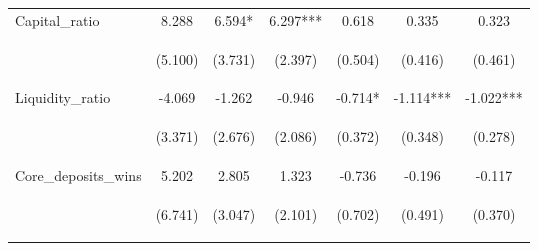\documentclass[]{article}
\begin{document}
\begin{center}
\begin{tabular}{lcccccc}
Capital\_ratio & 8.288 & 6.594* & 6.297*** & 0.618 & 0.335 & 0.323 \\
\vspace{4pt} & \begin{footnotesize}(5.100)\end{footnotesize} & \begin{footnotesize}(3.731)\end{footnotesize} & \begin{footnotesize}(2.397)\end{footnotesize} & \begin{footnotesize}(0.504)\end{footnotesize} & \begin{footnotesize}(0.416)\end{footnotesize} & \begin{footnotesize}(0.461)\end{footnotesize} \\
Liquidity\_ratio & -4.069 & -1.262 & -0.946 & -0.714* & -1.114*** & -1.022*** \\
\vspace{4pt} & \begin{footnotesize}(3.371)\end{footnotesize} & \begin{footnotesize}(2.676)\end{footnotesize} & \begin{footnotesize}(2.086)\end{footnotesize} & \begin{footnotesize}(0.372)\end{footnotesize} & \begin{footnotesize}(0.348)\end{footnotesize} & \begin{footnotesize}(0.278)\end{footnotesize} \\
Core\_deposits\_wins & 5.202 & 2.805 & 1.323 & -0.736 & -0.196 & -0.117 \\
\vspace{4pt} & \begin{footnotesize}(6.741)\end{footnotesize} & \begin{footnotesize}(3.047)\end{footnotesize} & \begin{footnotesize}(2.101)\end{footnotesize} & \begin{footnotesize}(0.702)\end{footnotesize} & \begin{footnotesize}(0.491)\end{footnotesize} & \begin{footnotesize}(0.370)\end{footnotesize} \\

\end{tabular}
\end{center}
\end{document}
